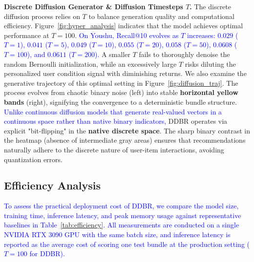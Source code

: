 \documentclass[lettersize,journal]{IEEEtran}
\newcommand{\revise}[1]{\textcolor{blue}{#1}}
\begin{document}
\noindent \textbf{Discrete Diffusion Generator \& Diffusion Timesteps $T$.}
\label{sec:hyper}
The discrete diffusion process relies on $T$ to balance generation quality and computational efficiency. Figure~\ref{fig:hyper_analysis} indicates that the model achieves optimal performance at $T=100$. \revise{On Youshu, Recall@10 evolves as $T$ increases: $0.029$ ($T=1$), $0.041$ ($T=5$), $0.049$ ($T=10$), $0.055$ ($T=20$), $0.058$ ($T=50$), $0.0608$ ($T=100$), and $0.0611$ ($T=200$).} A smaller $T$ fails to thoroughly denoise the random Bernoulli initialization, while an excessively large $T$ risks diluting the personalized user condition signal with diminishing returns. We also examine the generative trajectory of this optimal setting in Figure~\ref{fig:diffusion_traj}. The process evolves from chaotic binary noise (left) into stable \textbf{horizontal yellow bands} (right), signifying the convergence to a deterministic bundle structure. \revise{Unlike continuous diffusion models that generate real-valued vectors in a continuous space rather than native binary indicators,} DDBR operates via explicit "bit-flipping" in the \textbf{native discrete space}. The sharp binary contrast in the heatmap (absence of intermediate gray areas) ensures that recommendations naturally adhere to the discrete nature of user-item interactions, avoiding quantization errors.



\subsection{Efficiency Analysis}
\label{sec:efficiency}
\revise{To assess the practical deployment cost of DDBR, we compare the model size, training time, inference latency, and peak memory usage against representative baselines in Table~\ref{tab:efficiency}. All measurements are conducted on a single NVIDIA RTX 3090 GPU with the same batch size, and inference latency is reported as the average cost of scoring one test bundle at the production setting ($T=100$ for DDBR).}
\end{document}

